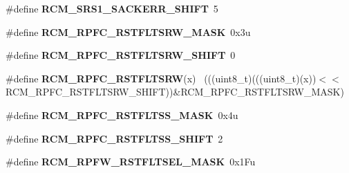 \begin{DoxyCompactItemize}
\item 
\hypertarget{group___r_c_m___register___masks_gab30a0b3f954edb8a480649686bd208fb}{}\#define {\bfseries R\+C\+M\+\_\+\+S\+R\+S1\+\_\+\+S\+A\+C\+K\+E\+R\+R\+\_\+\+S\+H\+I\+F\+T}~5\label{group___r_c_m___register___masks_gab30a0b3f954edb8a480649686bd208fb}

\item 
\hypertarget{group___r_c_m___register___masks_ga36e0fc448dc94b90314dd6dd2dd41763}{}\#define {\bfseries R\+C\+M\+\_\+\+R\+P\+F\+C\+\_\+\+R\+S\+T\+F\+L\+T\+S\+R\+W\+\_\+\+M\+A\+S\+K}~0x3u\label{group___r_c_m___register___masks_ga36e0fc448dc94b90314dd6dd2dd41763}

\item 
\hypertarget{group___r_c_m___register___masks_gad869b7629ba10023abe459d7293fd281}{}\#define {\bfseries R\+C\+M\+\_\+\+R\+P\+F\+C\+\_\+\+R\+S\+T\+F\+L\+T\+S\+R\+W\+\_\+\+S\+H\+I\+F\+T}~0\label{group___r_c_m___register___masks_gad869b7629ba10023abe459d7293fd281}

\item 
\hypertarget{group___r_c_m___register___masks_ga3ca72ed675321a6b8939c43f1616ecc6}{}\#define {\bfseries R\+C\+M\+\_\+\+R\+P\+F\+C\+\_\+\+R\+S\+T\+F\+L\+T\+S\+R\+W}(x)                                    ~(((uint8\+\_\+t)(((uint8\+\_\+t)(x))$<$$<$R\+C\+M\+\_\+\+R\+P\+F\+C\+\_\+\+R\+S\+T\+F\+L\+T\+S\+R\+W\+\_\+\+S\+H\+I\+F\+T))\&R\+C\+M\+\_\+\+R\+P\+F\+C\+\_\+\+R\+S\+T\+F\+L\+T\+S\+R\+W\+\_\+\+M\+A\+S\+K)\label{group___r_c_m___register___masks_ga3ca72ed675321a6b8939c43f1616ecc6}

\item 
\hypertarget{group___r_c_m___register___masks_gadfb0f8132fbbc978c9756a2adfbf2ed0}{}\#define {\bfseries R\+C\+M\+\_\+\+R\+P\+F\+C\+\_\+\+R\+S\+T\+F\+L\+T\+S\+S\+\_\+\+M\+A\+S\+K}~0x4u\label{group___r_c_m___register___masks_gadfb0f8132fbbc978c9756a2adfbf2ed0}

\item 
\hypertarget{group___r_c_m___register___masks_ga4c39eb26fa537bf5e4e6b0ea82ffaeb2}{}\#define {\bfseries R\+C\+M\+\_\+\+R\+P\+F\+C\+\_\+\+R\+S\+T\+F\+L\+T\+S\+S\+\_\+\+S\+H\+I\+F\+T}~2\label{group___r_c_m___register___masks_ga4c39eb26fa537bf5e4e6b0ea82ffaeb2}

\item 
\hypertarget{group___r_c_m___register___masks_ga60f29f78d245476ae9716d81b5728739}{}\#define {\bfseries R\+C\+M\+\_\+\+R\+P\+F\+W\+\_\+\+R\+S\+T\+F\+L\+T\+S\+E\+L\+\_\+\+M\+A\+S\+K}~0x1\+Fu\label{group___r_c_m___register___masks_ga60f29f78d245476ae9716d81b5728739}


\end{DoxyCompactItemize}

